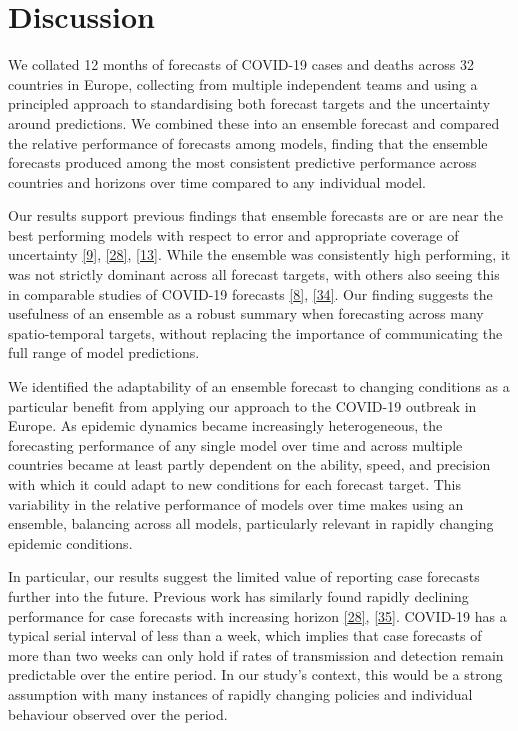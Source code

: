 \documentclass[
]{article}
\begin{document}
\hypertarget{discussion}{%
\section{Discussion}\label{discussion}}

We collated 12 months of forecasts of COVID-19 cases and deaths across
32 countries in Europe, collecting from multiple independent teams and
using a principled approach to standardising both forecast targets and
the uncertainty around predictions. We combined these into an ensemble
forecast and compared the relative performance of forecasts among
models, finding that the ensemble forecasts produced among the most
consistent predictive performance across countries and horizons over
time compared to any individual model.

Our results support previous findings that ensemble forecasts are or are
near the best performing models with respect to error and appropriate
coverage of uncertainty
\protect\hyperlink{ref-funkShorttermForecastsInform2020}{{[}9{]}},
\protect\hyperlink{ref-cramerEvaluationIndividualEnsemble2021}{{[}28{]}},
\protect\hyperlink{ref-viboudRAPIDDEbolaForecasting2018}{{[}13{]}}.
While the ensemble was consistently high performing, it was not strictly
dominant across all forecast targets, with others also seeing this in
comparable studies of COVID-19 forecasts
\protect\hyperlink{ref-bracherPreregisteredShorttermForecasting2021}{{[}8{]}},
\protect\hyperlink{ref-brooksComparingEnsembleApproaches2020}{{[}34{]}}.
Our finding suggests the usefulness of an ensemble as a robust summary
when forecasting across many spatio-temporal targets, without replacing
the importance of communicating the full range of model predictions.

We identified the adaptability of an ensemble forecast to changing
conditions as a particular benefit from applying our approach to the
COVID-19 outbreak in Europe. As epidemic dynamics became increasingly
heterogeneous, the forecasting performance of any single model over time
and across multiple countries became at least partly dependent on the
ability, speed, and precision with which it could adapt to new
conditions for each forecast target. This variability in the relative
performance of models over time makes using an ensemble, balancing
across all models, particularly relevant in rapidly changing epidemic
conditions.

In particular, our results suggest the limited value of reporting case
forecasts further into the future. Previous work has similarly found
rapidly declining performance for case forecasts with increasing horizon
\protect\hyperlink{ref-cramerEvaluationIndividualEnsemble2021}{{[}28{]}},
\protect\hyperlink{ref-castroTurningPointEnd2020}{{[}35{]}}. COVID-19
has a typical serial interval of less than a week, which implies that
case forecasts of more than two weeks can only hold if rates of
transmission and detection remain predictable over the entire period. In
our study's context, this would be a strong assumption with many
instances of rapidly changing policies and individual behaviour observed
over the period.
\end{document}
